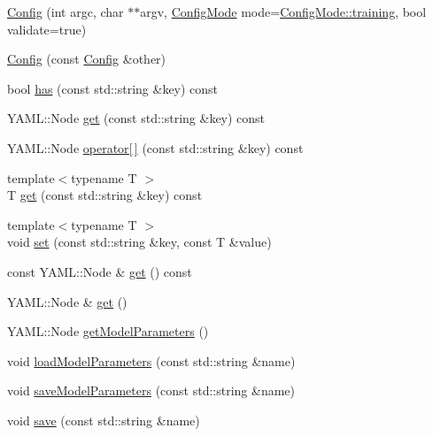 \begin{DoxyCompactItemize}
\item 
\hyperlink{classmarian_1_1Config_aa953cca7c4650e7e0538f00388d9f385}{Config} (int argc, char $\ast$$\ast$argv, \hyperlink{namespacemarian_aaddd4b008ff5352b1fe7e16574f7e1f9}{Config\+Mode} mode=\hyperlink{namespacemarian_aaddd4b008ff5352b1fe7e16574f7e1f9ac185ddac8b5a8f5aa23c5b80bc12d214}{Config\+Mode\+::training}, bool validate=true)
\item 
\hyperlink{classmarian_1_1Config_a13774d365b7b891e2f14078832032aff}{Config} (const \hyperlink{classmarian_1_1Config}{Config} \&other)
\item 
bool \hyperlink{classmarian_1_1Config_ab3058530188cfb4eae1bbabfcf4d6bee}{has} (const std\+::string \&key) const 
\item 
Y\+A\+M\+L\+::\+Node \hyperlink{classmarian_1_1Config_a4a765930cfec40c60b48266ed7693109}{get} (const std\+::string \&key) const 
\item 
Y\+A\+M\+L\+::\+Node \hyperlink{classmarian_1_1Config_a955142b802b95bcac26014985e5509f7}{operator\mbox{[}$\,$\mbox{]}} (const std\+::string \&key) const 
\item 
{\footnotesize template$<$typename T $>$ }\\T \hyperlink{classmarian_1_1Config_aab37767c3fe86331e91ac0a26a8c50f2}{get} (const std\+::string \&key) const 
\item 
{\footnotesize template$<$typename T $>$ }\\void \hyperlink{classmarian_1_1Config_a024ad20b2fa0be8112bb29aeef448d29}{set} (const std\+::string \&key, const T \&value)
\item 
const Y\+A\+M\+L\+::\+Node \& \hyperlink{classmarian_1_1Config_aba3e2758003d471e90fe9eac082a0a56}{get} () const 
\item 
Y\+A\+M\+L\+::\+Node \& \hyperlink{classmarian_1_1Config_aa42a57837e2d0cdeaa236e1cebd72b72}{get} ()
\item 
Y\+A\+M\+L\+::\+Node \hyperlink{classmarian_1_1Config_a8bb35987743e02b1752b4598337510e4}{get\+Model\+Parameters} ()
\item 
void \hyperlink{classmarian_1_1Config_a88b17725ec749ce6fa43e8722dbe0f7b}{load\+Model\+Parameters} (const std\+::string \&name)
\item 
void \hyperlink{classmarian_1_1Config_a34c944633d8c66e513bf50da4469de39}{save\+Model\+Parameters} (const std\+::string \&name)
\item 
void \hyperlink{classmarian_1_1Config_ad02ea584a6a4d2caf2743b50dcb9e9f1}{save} (const std\+::string \&name)
\end{DoxyCompactItemize}
